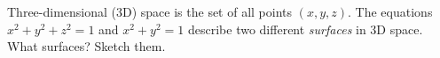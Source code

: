 Three-dimensional (3D) space is the set of all points $(x,y,z)$.  The equations $x^2 + y^2 + z^2 = 1$ and $x^2 + y^2 = 1$ describe two different \emph{surfaces} in 3D space.  What surfaces?  Sketch them.

\begin{comment}
\vspace{0.5in}
\hfill \begin{tikzpicture}[scale=5]
\coordinate (O) at (0,0,0);
\draw[thick,->] (O) -- (1.05,0,0) node[anchor=north east]{$y$};
\draw[thick,->] (O) -- (0,1.05,0) node[anchor=north west]{$z$};
\draw[thick,->] (O) -- (0,0,1.05) node[anchor=north east]{$x$};
\end{tikzpicture}
\end{comment}
